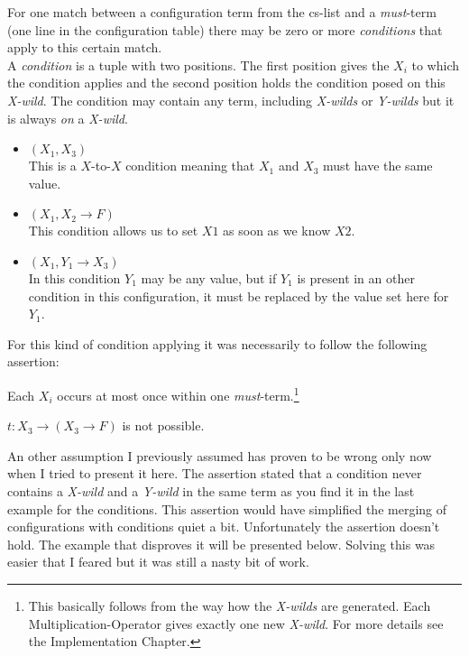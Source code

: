 \begin{definition}
For one match between a configuration term from the cs-list and a \emph{must}-term (one line in the configuration table) there may be zero or more \emph{conditions} that apply to this certain match. \\
A \emph{condition} is a tuple with two positions. The first position gives the $X_i$ to which the condition applies and the second position holds the condition posed on this \emph{X-wild}. The condition may contain any term, including \emph{X-wilds} or \emph{Y-wilds} but it is always \emph{on} a \emph{X-wild}.
\end{definition}

\begin{example}
	\begin{itemize}Conditions on $X_i$
		\item $(X_1, X_3)$\\ This is a $X$-to-$X$ condition meaning that $X_1$ and $X_3$ must have the same value.
		\item $(X_1, X_2 \rightarrow F)$\\ This condition allows us to set $X1$ as soon as we know $X2$.
		\item $(X_1, Y_1 \rightarrow X_3)$\\ In this condition $Y_1$ may be any value, but if $Y_1$ is present in an other condition in this configuration, it must be replaced by the value set here for $Y_1$.
	\end{itemize}
\end{example}

For this kind of condition applying it was necessarily to follow the following assertion:

\begin{assertion}
Each $X_i$ occurs at most once within one \emph{must}-term.\footnote{This basically follows from the way how the \emph{X-wilds} are generated. Each Multiplication-Operator gives exactly one new \emph{X-wild}. For more details see the Implementation Chapter.}
\end{assertion}


\begin{example}
$t:X_3 \rightarrow (X_3 \rightarrow F)$ is not possible.
\end{example}

An other assumption I previously assumed has proven to be wrong only now when I tried to present it here. The assertion stated that a condition never contains a \emph{X-wild} and a \emph{Y-wild} in the same term as you find it in the last example for the conditions. This assertion would have simplified the merging of configurations with conditions quiet a bit. Unfortunately the assertion doesn't hold. The example that disproves it will be presented below. Solving this was easier that I feared but it was still a nasty bit of work.

